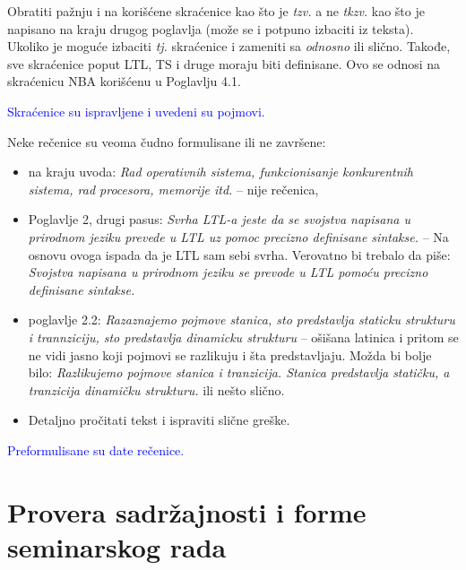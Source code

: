 \documentclass[a4paper]{report}
\newcommand{\odgovor}[1]{\textcolor{blue}{#1}}
\begin{document}
Obratiti pažnju i na korišćene skraćenice kao što je \textit{tzv.} a ne \textit{tkzv.} kao što je napisano na kraju drugog poglavlja (može se i potpuno izbaciti iz teksta). Ukoliko je moguće izbaciti \textit{tj.} skraćenice i zameniti sa \textit{odnosno} ili slično. Takođe, sve skraćenice poput LTL, TS i druge moraju biti definisane. Ovo se odnosi na skraćenicu NBA korišćenu u Poglavlju 4.1.

\odgovor{Skraćenice su ispravljene i uvedeni su pojmovi.}

Neke rečenice su veoma čudno formulisane ili ne završene: 

\begin{itemize}
	\item na kraju uvoda: \textit{Rad operativnih sistema, funkcionisanje konkurentnih sistema, rad procesora, memorije itd.} -- nije rečenica,
	
	\item Poglavlje 2, drugi pasus: \textit{Svrha LTL-a jeste da se svojstva napisana u prirodnom jeziku prevede u LTL uz pomoc precizno definisane sintakse.} -- Na osnovu ovoga ispada da je LTL sam sebi svrha. Verovatno bi trebalo da piše: \textit{Svojstva napisana u prirodnom jeziku se prevode u LTL pomoću precizno definisane sintakse.}
	
	\item poglavlje 2.2: \textit{Razaznajemo pojmove stanica, sto predstavlja staticku strukturu i trannziciju, sto predstavlja dinamicku strukturu} -- ošišana latinica i pritom se ne vidi jasno koji pojmovi se razlikuju i šta predstavljaju. Možda bi bolje bilo: \textit{Razlikujemo pojmove stanica i tranzicija. Stanica predstavlja statičku, a tranzicija dinamičku strukturu.} ili nešto slično.
	
	\item Detaljno pročitati tekst i ispraviti slične greške.
\end{itemize} 

\odgovor{Preformulisane su date rečenice.}

\section{Provera sadržajnosti i forme seminarskog rada}
\end{document}
